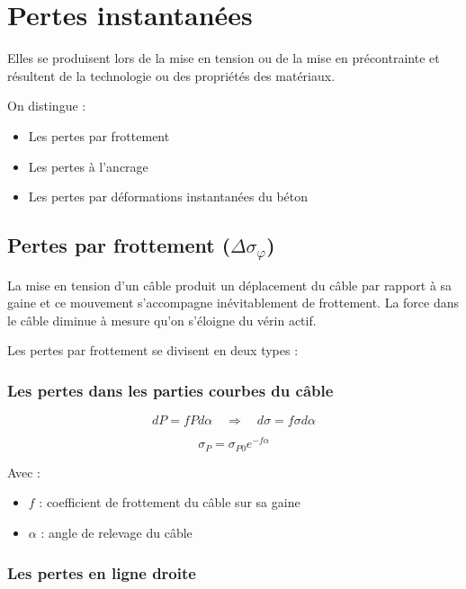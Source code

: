 \documentclass[12pt,a4paper]{article}
\begin{document}
\section{Pertes instantanées}

Elles se produisent lors de la mise en tension ou de la mise en précontrainte et résultent de la technologie ou des propriétés des matériaux.

On distingue :
\begin{itemize}
    \item Les pertes par frottement
    \item Les pertes à l'ancrage
    \item Les pertes par déformations instantanées du béton
\end{itemize}

\subsection{Pertes par frottement ($\Delta \sigma_\varphi$)}

La mise en tension d'un câble produit un déplacement du câble par rapport à sa gaine et ce mouvement s'accompagne inévitablement de frottement. La force dans le câble diminue à mesure qu'on s'éloigne du vérin actif.

Les pertes par frottement se divisent en deux types :

\subsubsection{Les pertes dans les parties courbes du câble}

\begin{equation}
dP = f P d\alpha \quad \Rightarrow \quad d\sigma = f \sigma d\alpha
\end{equation}

\begin{equation}
\sigma_P = \sigma_{P0} e^{-f\alpha}
\end{equation}

Avec :
\begin{itemize}
    \item $f$ : coefficient de frottement du câble sur sa gaine
    \item $\alpha$ : angle de relevage du câble
\end{itemize}

\subsubsection{Les pertes en ligne droite}
\end{document}
